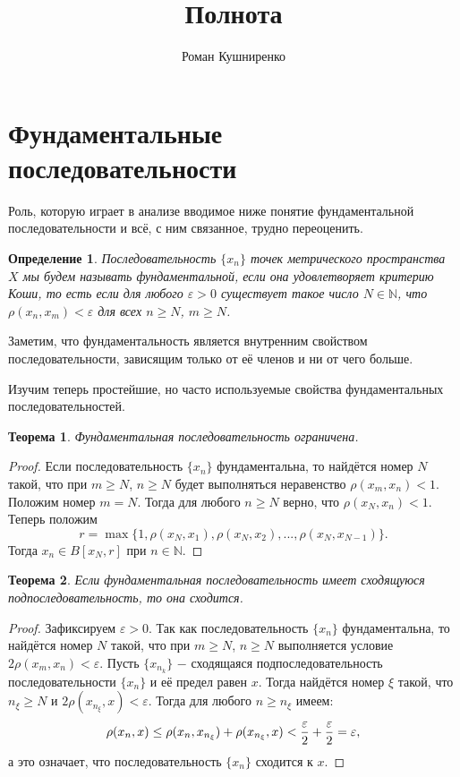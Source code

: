 \documentclass{article}
\title{Полнота}
\author{Роман Кушниренко}
\newtheorem{theorem}{Теорема}[section]
\newtheorem{definition}{Определение}[section]
\begin{document}

	\maketitle

	\section{Фундаментальные последовательности}

Роль, которую играет в анализе вводимое ниже понятие фундаментальной последовательности и всё, с ним связанное, трудно переоценить.

\begin{definition}
Последовательность \(\{x_n\}\) точек метрического пространства \(X\) мы будем называть фундаментальной, если она удовлетворяет критерию Коши, то есть если для любого \(\varepsilon > 0\) существует такое число \(N \in \mathbb{N}\), что \(\rho(x_n, x_m) < \varepsilon\) для всех \(n \geq N\), \(m \geq N\).
\end{definition}

Заметим, что фундаментальность является внутренним свойством последовательности, зависящим только от её членов и ни от чего больше.

Изучим теперь простейшие, но часто используемые свойства фундаментальных последовательностей.

\begin{theorem}
Фундаментальная последовательность ограничена.
\end{theorem}

\begin{proof}
Если последовательность \(\{x_n\}\) фундаментальна, то найдётся номер \(N\) такой, что при \(m \geq N\), \(n \geq N\) будет выполняться неравенство \(\rho(x_m, x_n) < 1\). Положим номер \(m = N\). Тогда для любого \(n \geq N\) верно, что \(\rho(x_N, x_n) < 1\). Теперь положим
\[
r = \max \{1, \rho(x_N, x_1), \rho(x_N, x_2), ..., \rho(x_N, x_{N - 1})\}.
\]
Тогда \(x_n \in B[x_N, r]\) при \(n \in \mathbb{N}\).
\end{proof}

\begin{theorem}
Если фундаментальная последовательность имеет сходящуюся подпоследовательность, то она сходится.
\end{theorem}

\begin{proof}
Зафиксируем \(\varepsilon > 0\). Так как последовательность \(\{x_n\}\) фундаментальна, то найдётся номер \(N\) такой, что при \(m \geq N\), \(n \geq N\) выполняется условие \(2\rho(x_m, x_n) < \varepsilon\). Пусть \(\{x_{n_k}\}\) \(-\) сходящаяся подпоследовательность последовательности \(\{x_n\}\) и её предел равен \(x\). Тогда найдётся номер \(\xi\) такой, что \(n_\xi \geq N\) и \(2\rho(x_{n_\xi}, x) < \varepsilon\). Тогда для любого \(n \geq n_\xi\) имеем:
\[
\rho(x_n, x) \leq \rho(x_n, x_{n_\xi}) + \rho(x_{n_\xi}, x) < {\varepsilon \over 2} + {\varepsilon \over 2} = \varepsilon,
\]
а это означает, что последовательность \(\{x_n\}\) сходится к \(x\).
\end{proof}
\end{document}
